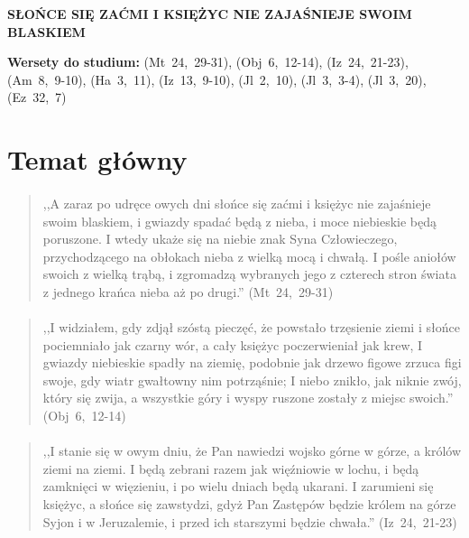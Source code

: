 \documentclass[10pt,a4paper,oneside]{article}
\begin{document}
\centerline{\textbf{\MakeUppercase{Słońce się zaćmi i księżyc nie zajaśnieje swoim blaskiem}}}
\begin{center}
\textbf{Wersety do studium:} \mbox{(Mt 24, 29-31)}, \mbox{(Obj 6, 12-14)}, \mbox{(Iz 24, 21-23)}, \mbox{(Am 8, 9-10)}, \mbox{(Ha 3, 11)}, \mbox{(Iz 13, 9-10)}, \mbox{(Jl 2, 10)}, \mbox{(Jl 3, 3-4)}, \mbox{(Jl 3, 20)}, \mbox{(Ez 32, 7)}
\end{center}
\section{Temat główny}
\paragraph{}
\begin{quote}
,,A zaraz po udręce owych dni słońce się zaćmi i księżyc nie zajaśnieje swoim blaskiem, i gwiazdy spadać będą z nieba, i moce niebieskie będą poruszone. I wtedy ukaże się na niebie znak Syna Człowieczego, przychodzącego na obłokach nieba z wielką mocą i chwałą. I pośle aniołów swoich z wielką trąbą, i zgromadzą wybranych jego z czterech stron świata z jednego krańca nieba aż po drugi.'' \mbox{(Mt 24, 29-31)}
\end{quote}
\paragraph{}
\begin{quote}
,,I widziałem, gdy zdjął szóstą pieczęć, że powstało trzęsienie ziemi i słońce pociemniało jak czarny wór, a cały księżyc poczerwieniał jak krew, I gwiazdy niebieskie spadły na ziemię, podobnie jak drzewo figowe zrzuca figi swoje, gdy wiatr gwałtowny nim potrząśnie; I niebo znikło, jak niknie zwój, który się zwija, a wszystkie góry i wyspy ruszone zostały z miejsc swoich.'' \mbox{(Obj 6, 12-14)}
\end{quote}
\paragraph{}
\begin{quote}
,,I stanie się w owym dniu, że Pan nawiedzi wojsko górne w górze, a królów ziemi na ziemi. I będą zebrani razem jak więźniowie w lochu, i będą zamknięci w więzieniu, i po wielu dniach będą ukarani. I zarumieni się księżyc, a słońce się zawstydzi, gdyż Pan Zastępów będzie królem na górze Syjon i w Jeruzalemie, i przed ich starszymi będzie chwała.'' \mbox{(Iz 24, 21-23)}
\end{quote}
\end{document}

